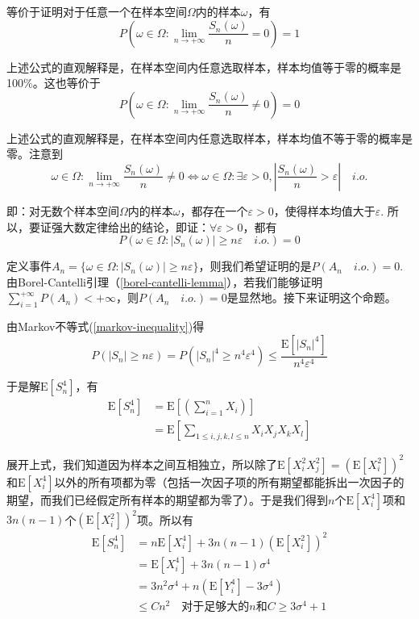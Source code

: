 \documentclass[UTF8]{ctexbook}
\begin{document}
等价于证明对于任意一个在样本空间$\Omega$内的样本$\omega$，有
\[
	P\left(\omega\in\Omega:\lim_{n\to+\infty}\frac{S_n(\omega)}{n}=0\right)=1
\]

上述公式的直观解释是，在样本空间内任意选取样本，样本均值等于零的概率是100\%。这也等价于
\[
	P\left(\omega\in\Omega:\lim_{n\to+\infty}\frac{S_n(\omega)}{n}\neq0\right)=0
\]

上述公式的直观解释是，在样本空间内任意选取样本，样本均值不等于零的概率是零。注意到
\[
	\omega\in\Omega:\lim_{n\to+\infty}\frac{S_n(\omega)}{n}\neq0\Longleftrightarrow\omega\in\Omega:\exists\varepsilon>0,\left|\frac{S_n(\omega)}{n}>\varepsilon\right|\quad i.o.
\]

即：对无数个样本空间$\Omega$内的样本$\omega$，都存在一个$\varepsilon>0$，使得样本均值大于$\varepsilon$. 所以，要证强大数定律给出的结论，即证：$\forall\varepsilon>0$，都有
\[
	P\left(\omega\in\Omega:|S_n(\omega)|\geq n\varepsilon\quad i.o.\right)=0
\]

定义事件$A_n=\{\omega\in\Omega:|S_n(\omega)|\geq n\varepsilon\}$，则我们希望证明的是$P(A_n\quad i.o.)=0$.由Borel-Cantelli引理（\ref{borel-cantelli-lemma}），若我们能够证明$\sum_{i=1}^{+\infty}P(A_n)<+\infty$，则$P(A_n\quad i.o.)=0$是显然地。接下来证明这个命题。

由Markov不等式(\ref{markov-inequality})得
\[
	P\left(|S_n|\geq n\varepsilon\right)=P\left(|S_n|^4\geq n^4\varepsilon^4\right)\leq\frac{\mathrm E[|S_n|^4]}{n^4\varepsilon^4}
\]

于是解$\mathrm E[S_n^4]$，有
\begin{align*}
	\mathrm E[S_n^4]&=\mathrm E\left[\left(\sum_{i=1}^nX_i\right)\right] \\
	&=\mathrm E\left[\sum_{1\leq i,j,k,l\leq n}X_iX_jX_kX_l\right]
\end{align*}

展开上式，我们知道因为样本之间互相独立，所以除了$\mathrm E[X_i^2X_j^2]=(\mathrm E[X_i^2])^2$和$\mathrm E[X_i^4]$以外的所有项都为零（包括一次因子项的所有期望都能拆出一次因子的期望，而我们已经假定所有样本的期望都为零了）。于是我们得到$n$个$\mathrm E[X_i^4]$项和$3n(n-1)$个$(\mathrm E[X_i^2])^2$项。所以有
\begin{align*}
	\mathrm E[S_n^4]&=n\mathrm E[X_i^4]+3n(n-1)(\mathrm E[X_i^2])^2\\
	&=\mathrm E[X_i^4]+3n(n-1)\sigma^4 \\
	&=3n^2\sigma^4+n(\mathrm E[Y_i^4]-3\sigma^4) \\
	&\leq Cn^2\quad\text{对于足够大的$n$和$C\geq3\sigma^4+1$}
\end{align*}
\end{document}
